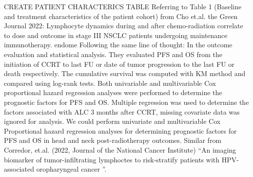 \documentclass{article}%
\begin{document}
\newline%
%
\newline%
\newline%
%
CREATE PATIENT CHARACTERICS TABLE %
\newline%
\newline%
%
Referring to Table 1 (Baseline and treatment characteristics of the patient cohort) from Cho et.al. the Green Journal 2022: Lymphocyte dynamics during and after chemo{-}radiation correlate to dose and outcome in stage III NSCLC patients undergoing maintenance immunotherapy. %
\newline%
\newline%
%
endome%
\newline%
\newline%
%
Following the same line of thought: %
\newline%
\newline%
%
In the outcome evaluation and statistical analysis. They evaluated PFS and OS from the initiation of CCRT to last FU or date of tumor progression to the last FU or death respectively. The cumulative survival was computed with KM method and compared using log{-}rank tests. Both univariable and multivariable Cox proportional hazard regression analyses were performed to determine the prognostic factors for PFS and OS. Multiple regression was used to determine the factors associated with ALC 3 months after CCRT, missing covariate data was ignored for analysis. %
\newline%
\newline%
%
We could perform univariate and multivariable Cox Proportional hazard regression analyses for determining prognostic factors for PFS and OS in head and neck post{-}radiotherapy outcomes. %
\newline%
\newline%
%
Similar from Corredor, et.al. (2022, Journal of the National Cancer Institute) “An imaging biomarker of tumor{-}infiltrating lymphoctes to risk{-}stratify patients with HPV{-}associated oropharyngeal cancer ”. %
\newline%
\newline%
%
\end{document}

